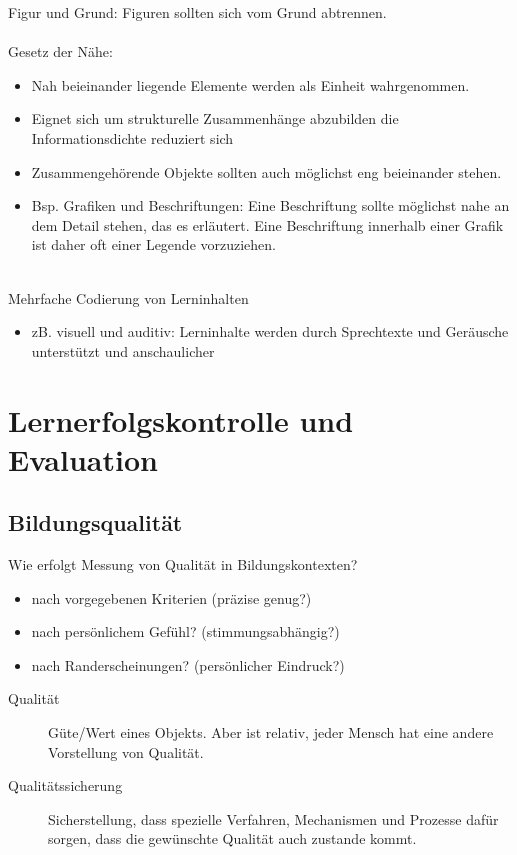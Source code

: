 \documentclass[a4paper]{article}
\begin{document}
Figur und Grund: Figuren sollten sich vom Grund abtrennen.\\
\\
Gesetz der Nähe:
\begin{itemize}
	\item Nah beieinander liegende Elemente werden als Einheit wahrgenommen.
	\item Eignet sich um strukturelle Zusammenhänge abzubilden \textrightarrow die Informationsdichte reduziert sich
	\item Zusammengehörende Objekte sollten auch möglichst eng beieinander stehen.
	\item Bsp. Grafiken und Beschriftungen: Eine Beschriftung sollte möglichst nahe an dem Detail stehen, das es erläutert. Eine Beschriftung innerhalb einer Grafik ist daher oft einer Legende vorzuziehen.
\end{itemize}
~\\
Mehrfache Codierung von Lerninhalten
\begin{itemize}
	\item zB. visuell und auditiv: Lerninhalte werden durch Sprechtexte und Geräusche unterstützt und anschaulicher
\end{itemize}

\section{Lernerfolgskontrolle und Evaluation}

\subsection{Bildungsqualität}

Wie erfolgt Messung von Qualität in Bildungskontexten?
\begin{itemize}
	\item nach vorgegebenen Kriterien (präzise genug?)
	\item nach persönlichem Gefühl? (stimmungsabhängig?)
	\item nach Randerscheinungen? (persönlicher Eindruck?)
\end{itemize}

\begin{description}
	\item[Qualität] Güte/Wert eines Objekts. Aber ist relativ, jeder Mensch hat eine andere Vorstellung von Qualität.
	\item[Qualitätssicherung] Sicherstellung, dass spezielle Verfahren, Mechanismen und Prozesse dafür sorgen, dass die gewünschte Qualität auch zustande kommt.
\end{description}
\end{document}
